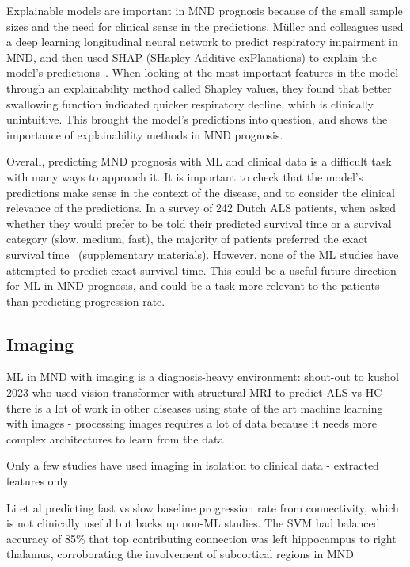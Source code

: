 Explainable models are important in MND prognosis because of the small sample sizes and the need for clinical sense in the predictions.
Müller and colleagues used a deep learning longitudinal neural network to predict respiratory impairment in MND, and then used SHAP (SHapley Additive exPlanations) to explain the model's predictions~\cite{mullerExplainableModelsDisease2021}.
When looking at the most important features in the model through an explainability method called Shapley values, they found that better swallowing function indicated quicker respiratory decline, which is clinically unintuitive.
This brought the model's predictions into question, and shows the importance of explainability methods in MND prognosis.

Overall, predicting MND prognosis with ML and clinical data is a difficult task with many ways to approach it.
It is important to check that the model's predictions make sense in the context of the disease, and to consider the clinical relevance of the predictions.
In a survey of 242 Dutch ALS patients, when asked whether they would prefer to be told their predicted survival time or a survival category (slow, medium, fast), the majority of patients preferred the exact survival time~\cite{westenengPrognosisPatientsAmyotrophic2018} (supplementary materials).
However, none of the ML studies have attempted to predict exact survival time.
This could be a useful future direction for ML in MND prognosis, and could be a task more relevant to the patients than predicting progression rate.


\subsection{Imaging}


ML in MND with imaging is a diagnosis-heavy environment: shout-out to kushol 2023 who used vision transformer with structural MRI to predict ALS vs HC
- there is a lot of work in other diseases using state of the art machine learning with images
- processing images requires a lot of data because it needs more complex architectures to learn from the data

Only a few studies have used imaging in isolation to clinical data
- extracted features only

Li et al predicting fast vs slow baseline progression rate from connectivity, which is not clinically useful but backs up non-ML studies.
The SVM had balanced accuracy of 85\% that top contributing connection was left hippocampus to right thalamus, corroborating the involvement of subcortical regions in MND

